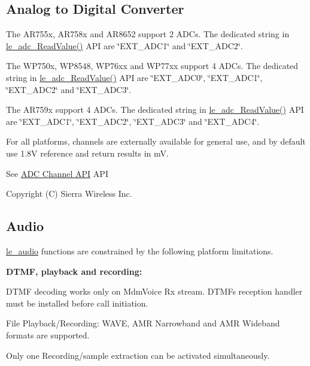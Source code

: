  \hypertarget{platformConstraintsAdc}{}\subsection{Analog to Digital Converter}\label{platformConstraintsAdc}
The A\+R755x, A\+R758x and A\+R8652 support 2 A\+D\+Cs. The dedicated string in \hyperlink{le__adc__interface_8h_a9a8e160720de8de284c6c89d3f3fc4e3}{le\+\_\+adc\+\_\+\+Read\+Value()} A\+PI are \char`\"{}\+E\+X\+T\+\_\+\+A\+D\+C1\char`\"{} and \char`\"{}\+E\+X\+T\+\_\+\+A\+D\+C2\char`\"{}.

The W\+P750x, W\+P8548, W\+P76xx and W\+P77xx support 4 A\+D\+Cs. The dedicated string in \hyperlink{le__adc__interface_8h_a9a8e160720de8de284c6c89d3f3fc4e3}{le\+\_\+adc\+\_\+\+Read\+Value()} A\+PI are \char`\"{}\+E\+X\+T\+\_\+\+A\+D\+C0\char`\"{}, \char`\"{}\+E\+X\+T\+\_\+\+A\+D\+C1\char`\"{}, \char`\"{}\+E\+X\+T\+\_\+\+A\+D\+C2\char`\"{} and \char`\"{}\+E\+X\+T\+\_\+\+A\+D\+C3\char`\"{}.

The A\+R759x support 4 A\+D\+Cs. The dedicated string in \hyperlink{le__adc__interface_8h_a9a8e160720de8de284c6c89d3f3fc4e3}{le\+\_\+adc\+\_\+\+Read\+Value()} A\+PI are \char`\"{}\+E\+X\+T\+\_\+\+A\+D\+C1\char`\"{}, \char`\"{}\+E\+X\+T\+\_\+\+A\+D\+C2\char`\"{}, \char`\"{}\+E\+X\+T\+\_\+\+A\+D\+C3\char`\"{} and \char`\"{}\+E\+X\+T\+\_\+\+A\+D\+C4\char`\"{}.

For all platforms, channels are externally available for general use, and by default use 1.\+8V reference and return results in mV.

See \hyperlink{c_adc}{A\+DC Channel A\+PI} A\+PI

Copyright (C) Sierra Wireless Inc. \hypertarget{platformConstraintsAudio}{}\subsection{Audio}\label{platformConstraintsAudio}
\hyperlink{c_audio}{le\+\_\+audio} functions are constrained by the following platform limitations.

{\bfseries D\+T\+MF, playback and recording\+:}
\begin{DoxyItemize}
\item D\+T\+MF decoding works only on Mdm\+Voice Rx stream. D\+T\+MF\textquotesingle{}s reception handler must be installed before call initiation.
\item File Playback/\+Recording\+: W\+A\+VE, A\+MR Narrowband and A\+MR Wideband formats are supported.
\item Only one Recording/sample extraction can be activated simultaneously.
\end{DoxyItemize}





